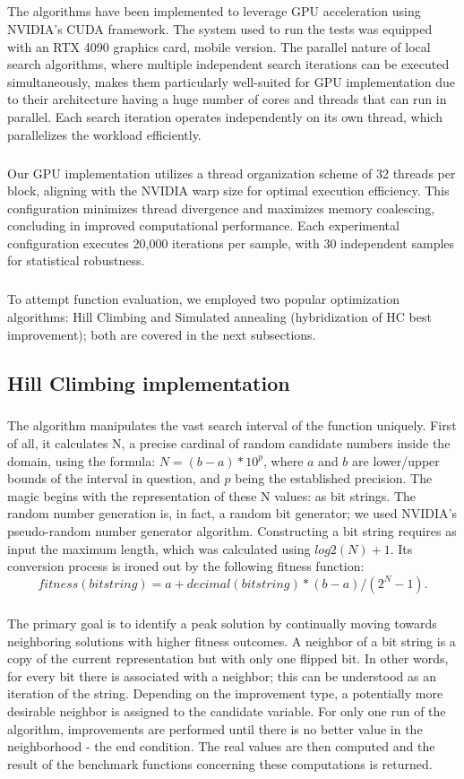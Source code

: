 \documentclass{article}
\begin{document}
\subparagraph{}
The algorithms have been implemented to leverage GPU acceleration using NVIDIA's CUDA framework. The system used to run the tests was equipped with an RTX 4090 graphics card, mobile version. The parallel nature of local search algorithms, where multiple independent search iterations can be executed simultaneously, makes them particularly well-suited for GPU implementation due to their architecture having a huge number of cores and threads that can run in parallel. Each search iteration operates independently on its own thread, which parallelizes the workload efficiently.

\subparagraph{}
Our GPU implementation utilizes a thread organization scheme of 32 threads per block, aligning with the NVIDIA warp size for optimal execution efficiency. This configuration minimizes thread divergence and maximizes memory coalescing, concluding in improved computational performance. Each experimental configuration executes 20,000 iterations per sample, with 30 independent samples for statistical robustness.

\subparagraph{}
To attempt function evaluation, we employed two popular optimization algorithms: Hill Climbing and Simulated annealing (hybridization of HC best improvement); both are covered in the next subsections.

\subsection{Hill Climbing implementation}

\subparagraph{}
The algorithm manipulates the vast search interval of the function uniquely. First of all, it calculates N, a precise cardinal of random candidate numbers inside the domain, using the formula: $ N = (b-a)*10^p$,  where $a$ and $b$ are lower/upper bounds of the interval in question, and $p$ being the established precision. The magic begins with the representation of these N values: as bit strings. The random number generation is, in fact, a random bit generator; we used NVIDIA's pseudo-random number generator algorithm. Constructing a bit string requires as input the maximum length, which was calculated using $log2(N) + 1$. Its conversion process is ironed out by the following fitness function: $$fitness(bitstring) = a + decimal(bitstring) * (b - a) / (2^N - 1) .$$

\subparagraph{}
The primary goal is to identify a peak solution by continually moving towards neighboring solutions with higher fitness outcomes. A neighbor of a bit string is a copy of the current representation but with only one flipped bit. In other words, for every bit there is associated with a neighbor; this can be understood as an iteration of the string. Depending on the improvement type, a potentially more desirable neighbor is assigned to the candidate variable. For only one run of the algorithm, improvements are performed until there is no better value in the neighborhood - the end condition. The real values are then computed and the result of the benchmark functions concerning these computations is returned.
\end{document}
